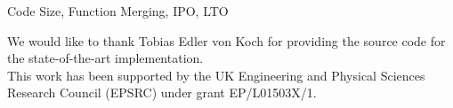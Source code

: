 \documentclass[10pt,reprint]{sigplanconf}
\begin{document}

\keywords
Code Size, Function Merging, IPO, LTO %


%







\begin{acks}
  We would like to thank Tobias Edler von Koch for providing the source
code for the state-of-the-art implementation.
  \\
  This work has been supported by the UK Engineering and Physical Sciences Research Council (EPSRC) under grant EP/L01503X/1.
\end{acks}










\clearpage


\end{document}
